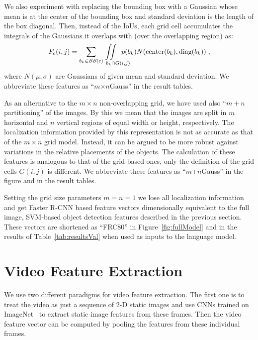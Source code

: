 We also experiment with replacing the bounding box with a Gaussian
whose mean is at the center of the bounding box and standard deviation
is the length of the box diagonal.
Then, instead of the IoUs, each grid cell accumulates the integrals of
the Gaussians it overlaps with (over the overlapping region) as:
\begin{equation}
  \label{eqn:Gauss}
  F_c(i,j) = \sum_{b_k \in \text{\it BB}(c)}\text{\hspace*{-7mm}}
  \iint\displaylimits_%
  {\text{\hspace{9mm}}b_k \cap G(i,j)}\text{\hspace*{-5mm}}
  p(b_k)N(\text{center}(b_k),\text{diag}(b_k)) \; ,
\end{equation}
where $N(\mu,\sigma)$ are Gaussians of given mean and standard deviation.
We abbreviate these features as ``$m$$\times${}$n$Gauss'' in the result
tables.

As an alternative to the $m\times n$ non-overlapping grid, we have
used also ``$m+n$ partitioning'' of the images.
By this we mean that the images are split in $m$ horizontal and $n$
vertical regions of equal width or height, respectively.
The localization information provided by this representation is not
as accurate as that of the $m\times n$ grid model.
Instead, it can be argued to be more robust against variations in the
relative placements of the objects.
The calculation of these features is analogous to that of the
grid-based ones, only the definition of the grid cells $G(i,j)$ is
different.
We abbreviate these features as ``$m$+$n$Gauss''
in the figure and in the result tables.

Setting the grid size parameters $m=n=1$ we lose all localization
information and get Faster R-CNN based feature vectors dimensionally
equivalent to the full image, SVM-based object detection features
described in the previous section.
These vectors are shortened as ``FRC80'' in Figure~\ref{fig:fullModel}
and in the results of
Table~\ref{tab:resultsVal} when used as inputs
to the language model.


\section{Video Feature Extraction}
\label{sec:VideoFeat}
We use two different paradigms for video feature extraction.
The first one is to treat the video as just a sequence of 2-D static
images and use CNNs trained on ImageNet~\cite{ImagenetOrig} to
extract static image features from these frames.
Then the video feature vector can be computed by pooling the features
from these individual frames.

